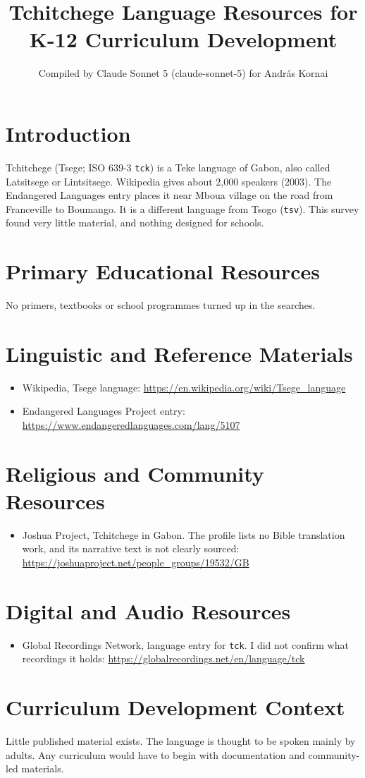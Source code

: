 \documentclass[12pt]{article}
\title{Tchitchege Language Resources for K-12 Curriculum Development}
\author{Compiled by Claude Sonnet 5 (claude-sonnet-5) for Andr\'as Kornai}
\date{}
\begin{document}
\maketitle

\section{Introduction}
Tchitchege (Tsege; ISO 639-3 \texttt{tck}) is a Teke language of Gabon, also called Latsitsege or Lintsitsege. Wikipedia gives about 2,000 speakers (2003). The Endangered Languages entry places it near Mboua village on the road from Franceville to Boumango. It is a different language from Tsogo (\texttt{tsv}). This survey found very little material, and nothing designed for schools.

\section{Primary Educational Resources}
No primers, textbooks or school programmes turned up in the searches.

\section{Linguistic and Reference Materials}
\begin{itemize}
\item Wikipedia, Tsege language: \url{https://en.wikipedia.org/wiki/Tsege_language}
\item Endangered Languages Project entry: \url{https://www.endangeredlanguages.com/lang/5107}
\end{itemize}

\section{Religious and Community Resources}
\begin{itemize}
\item Joshua Project, Tchitchege in Gabon. The profile lists no Bible translation work, and its narrative text is not clearly sourced: \url{https://joshuaproject.net/people_groups/19532/GB}
\end{itemize}

\section{Digital and Audio Resources}
\begin{itemize}
\item Global Recordings Network, language entry for \texttt{tck}. I did not confirm what recordings it holds: \url{https://globalrecordings.net/en/language/tck}
\end{itemize}

\section{Curriculum Development Context}
Little published material exists. The language is thought to be spoken mainly by adults. Any curriculum would have to begin with documentation and community-led materials.
\end{document}
